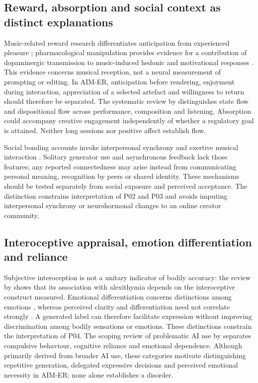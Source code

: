 \documentclass[11pt,a4paper]{article}
\begin{document}
\subsection{Reward, absorption and social context as distinct explanations}
Music-related reward research differentiates anticipation from experienced pleasure \citep{salimpoor2011}; pharmacological manipulation provides evidence for a contribution of dopaminergic transmission to music-induced hedonic and motivational responses \citep{ferreri2019}. This evidence concerns musical reception, not a neural measurement of prompting or editing. In AIM-ER, anticipation before rendering, enjoyment during interaction, appreciation of a selected artefact and willingness to return should therefore be separated. The systematic review by \citet{chirico2015} distinguishes state flow and dispositional flow across performance, composition and listening. Absorption could accompany creative engagement independently of whether a regulatory goal is attained. Neither long sessions nor positive affect establish flow.

Social bonding accounts invoke interpersonal synchrony and exertive musical interaction \citep{tarr2014}. Solitary generator use and asynchronous feedback lack those features; any reported connectedness may arise instead from communicating personal meaning, recognition by peers or shared identity. These mechanisms should be tested separately from social exposure and perceived acceptance. The distinction constrains interpretation of P02 and P03 and avoids imputing interpersonal synchrony or neurohormonal changes to an online creator community.

\subsection{Interoceptive appraisal, emotion differentiation and reliance}
Subjective interoception is not a unitary indicator of bodily accuracy: the review by \citet{vanbael2024} shows that its association with alexithymia depends on the interoceptive construct measured. Emotional differentiation concerns distinctions among emotions \citep{kashdan2015}, whereas perceived clarity and differentiation need not correlate strongly \citep{boden2013}. A generated label can therefore facilitate expression without improving discrimination among bodily sensations or emotions. These distinctions constrain the interpretation of P04. The scoping review of problematic AI use by \citet{dagnino2026} separates compulsive behaviour, cognitive reliance and emotional dependence. Although primarily derived from broader AI use, these categories motivate distinguishing repetitive generation, delegated expressive decisions and perceived emotional necessity in AIM-ER; none alone establishes a disorder.
\end{document}
